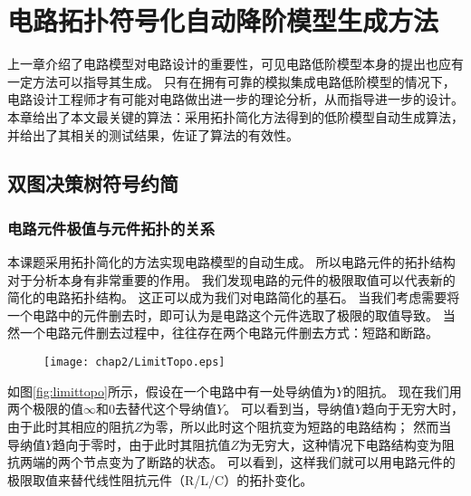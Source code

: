 
\chapter{电路拓扑符号化自动降阶模型生成方法}
\label{chap:simp}

上一章介绍了电路模型对电路设计的重要性，可见电路低阶模型本身的提出也应有一定方法可以指导其生成。
只有在拥有可靠的模拟集成电路低阶模型的情况下，电路设计工程师才有可能对电路做出进一步的理论分析，从而指导进一步的设计。
本章给出了本文最关键的算法：采用拓扑简化方法得到的低阶模型自动生成算法，并给出了其相关的测试结果，佐证了算法的有效性。

\section{双图决策树符号约简}
\label{sec:simp:GPDD}

\subsection{电路元件极值与元件拓扑的关系}
\label{subsec:simp:GPDD:TopoLimit}

本课题采用拓扑简化的方法实现电路模型的自动生成。
所以电路元件的拓扑结构对于分析本身有非常重要的作用。
我们发现电路的元件的极限取值可以代表新的简化的电路拓扑结构。
这正可以成为我们对电路简化的基石。
当我们考虑需要将一个电路中的元件删去时，即可认为是电路这个元件选取了极限的取值导致。
当然一个电路元件删去过程中，往往存在两个电路元件删去方式：短路和断路。

\begin{figure}[!htp]
	\centering
	\texttt{[image: chap2/LimitTopo.eps]}
\end{figure}

如图\ref{fig:limittopo}所示，假设在一个电路中有一处导纳值为$Y$的阻抗。
现在我们用两个极限的值$\infty$和$0$去替代这个导纳值$Y$。
可以看到当，导纳值$Y$趋向于无穷大时，由于此时其相应的阻抗$Z$为零，所以此时这个阻抗变为短路的电路结构；
然而当导纳值$Y$趋向于零时，由于此时其阻抗值$Z$为无穷大，这种情况下电路结构变为阻抗两端的两个节点变为了断路的状态。
可以看到，这样我们就可以用电路元件的极限取值来替代线性阻抗元件（R/L/C）的拓扑变化。

